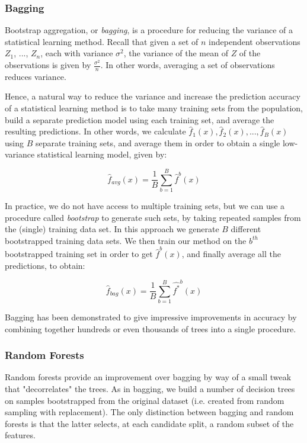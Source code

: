 \subsubsection{Bagging}

Bootstrap aggregation, or \textit{bagging}, is a procedure for reducing the variance of a statistical learning method. Recall that given a set of $n$ independent observations $Z_1$, ..., $Z_n$, each with variance $\sigma^2$, the variance of the mean of $Z$ of the observations is given by $\frac{\sigma^2}{n}$. In other words, averaging a set of observations reduces variance.

Hence, a natural way to reduce the variance and increase the prediction accuracy of a statistical learning method is to take many training sets from the population, build a separate prediction model using each training set, and average the resulting predictions. In other words, we calculate $\hat{f}_1(x), \hat{f}_2(x), ..., \hat{f}_B(x)$ using $B$ separate training sets, and average them in order to obtain a single low-variance statistical learning model, given by:

$$\hat{f}_{avg}(x) = \frac{1}{B} \sum_{b=1}^{B} \hat{f}^b(x)$$

In practice, we do not have access to multiple training sets, but we can use a procedure called \textit{bootstrap} to generate such sets, by taking repeated samples from the (single) training data set. In this approach we generate $B$ different bootstrapped training data sets. We then train our method on the $b^{th}$ bootstrapped training set in order to get $\hat{f}^b(x)$, and finally average all the predictions, to obtain:

$$\hat{f}_{bag}(x) = \frac{1}{B} \sum_{b=1}^{B} \hat{f^*}^b(x)$$

Bagging has been demonstrated to give impressive improvements in accuracy by combining together hundreds or even thousands of trees into a single procedure.

\subsubsection{Random Forests}
Random forests provide an improvement over bagging by way of a small tweak that "decorrelates" the trees. As in bagging, we build a number of decision trees on samples bootstrapped from the original dataset (i.e. created from random sampling with replacement). The only distinction between bagging and random forests is that the latter selects, at each candidate split, a random subset of the features.

